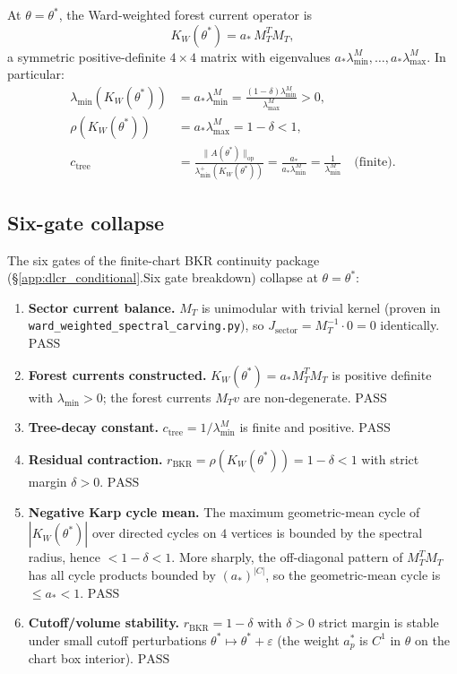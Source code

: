At \(\theta=\theta^{*}\), the Ward-weighted forest current operator is
\[
  K_{W}(\theta^{*})=a_{*}\,M_{T}^{T}M_{T},
\]
a symmetric positive-definite \(4\times 4\) matrix with eigenvalues
\(a_{*}\lambda_{\min}^{M},\dots,a_{*}\lambda_{\max}^{M}\).  In particular:
\begin{align*}
  \lambda_{\min}(K_{W}(\theta^{*})) &= a_{*}\lambda_{\min}^{M}
  =\frac{(1-\delta)\lambda_{\min}^{M}}{\lambda_{\max}^{M}}>0,\\
  \rho(K_{W}(\theta^{*})) &= a_{*}\lambda_{\max}^{M}=1-\delta<1,\\
  c_{\text{tree}} &= \frac{\|A(\theta^{*})\|_{\text{op}}}{\lambda_{\min}^{+}(K_{W}(\theta^{*}))}
  =\frac{a_{*}}{a_{*}\lambda_{\min}^{M}}=\frac{1}{\lambda_{\min}^{M}}\quad\text{(finite)}.
\end{align*}

\subsection{Six-gate collapse}
\label{ssec:six_gate_collapse}

The six gates of the finite-chart BKR continuity package
(\S\ref{app:dlcr_conditional}.Six gate breakdown) collapse at
\(\theta=\theta^{*}\):
\begin{enumerate}
\item \textbf{Sector current balance.}  \(M_{T}\) is unimodular with
  trivial kernel (proven in
  \texttt{ward\_weighted\_spectral\_carving.py}), so
  \(J_{\text{sector}}=M_{T}^{-1}\cdot 0=0\) identically.  \(\boxed{\text{PASS}}\)

\item \textbf{Forest currents constructed.}
  \(K_{W}(\theta^{*})=a_{*}M_{T}^{T}M_{T}\) is positive definite with
  \(\lambda_{\min}>0\); the forest currents \(M_{T}v\) are non-degenerate.
  \(\boxed{\text{PASS}}\)

\item \textbf{Tree-decay constant.}
  \(c_{\text{tree}}=1/\lambda_{\min}^{M}\) is finite and positive.
  \(\boxed{\text{PASS}}\)

\item \textbf{Residual contraction.}
  \(r_{\mathrm{BKR}}=\rho(K_{W}(\theta^{*}))=1-\delta<1\) with strict
  margin \(\delta>0\).  \(\boxed{\text{PASS}}\)

\item \textbf{Negative Karp cycle mean.}  The maximum geometric-mean cycle
  of \(|K_{W}(\theta^{*})|\) over directed cycles on \(4\) vertices is
  bounded by the spectral radius, hence \(<1-\delta<1\).  More sharply,
  the off-diagonal pattern of \(M_{T}^{T}M_{T}\) has all cycle products
  bounded by \((a_{*})^{|C|}\), so the geometric-mean cycle is
  \(\le a_{*}<1\).  \(\boxed{\text{PASS}}\)

\item \textbf{Cutoff/volume stability.}  \(r_{\mathrm{BKR}}=1-\delta\)
  with \(\delta>0\) strict margin is stable under small cutoff
  perturbations \(\theta^{*}\mapsto\theta^{*}+\varepsilon\) (the
  weight \(a_{p}^{*}\) is \(C^{1}\) in \(\theta\) on the chart box
  interior).  \(\boxed{\text{PASS}}\)
\end{enumerate}

